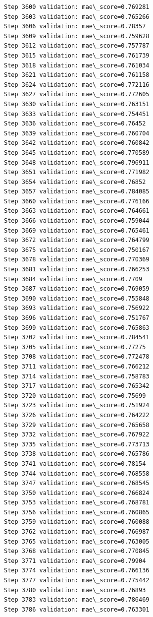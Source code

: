\documentclass[11pt]{article}
\begin{document}
\begin{Verbatim}[commandchars=\\\{\}]
Step 3600 validation: mae\_score=0.769281
Step 3603 validation: mae\_score=0.765266
Step 3606 validation: mae\_score=0.78357
Step 3609 validation: mae\_score=0.759628
Step 3612 validation: mae\_score=0.757787
Step 3615 validation: mae\_score=0.761739
Step 3618 validation: mae\_score=0.761034
Step 3621 validation: mae\_score=0.761158
Step 3624 validation: mae\_score=0.772116
Step 3627 validation: mae\_score=0.772605
Step 3630 validation: mae\_score=0.763151
Step 3633 validation: mae\_score=0.754451
Step 3636 validation: mae\_score=0.76452
Step 3639 validation: mae\_score=0.760704
Step 3642 validation: mae\_score=0.760842
Step 3645 validation: mae\_score=0.770589
Step 3648 validation: mae\_score=0.796911
Step 3651 validation: mae\_score=0.771982
Step 3654 validation: mae\_score=0.76852
Step 3657 validation: mae\_score=0.784085
Step 3660 validation: mae\_score=0.776166
Step 3663 validation: mae\_score=0.764661
Step 3666 validation: mae\_score=0.759044
Step 3669 validation: mae\_score=0.765461
Step 3672 validation: mae\_score=0.764799
Step 3675 validation: mae\_score=0.750167
Step 3678 validation: mae\_score=0.770369
Step 3681 validation: mae\_score=0.766253
Step 3684 validation: mae\_score=0.7709
Step 3687 validation: mae\_score=0.769059
Step 3690 validation: mae\_score=0.755848
Step 3693 validation: mae\_score=0.756922
Step 3696 validation: mae\_score=0.751767
Step 3699 validation: mae\_score=0.765863
Step 3702 validation: mae\_score=0.784541
Step 3705 validation: mae\_score=0.77275
Step 3708 validation: mae\_score=0.772478
Step 3711 validation: mae\_score=0.766212
Step 3714 validation: mae\_score=0.758783
Step 3717 validation: mae\_score=0.765342
Step 3720 validation: mae\_score=0.75699
Step 3723 validation: mae\_score=0.751924
Step 3726 validation: mae\_score=0.764222
Step 3729 validation: mae\_score=0.765658
Step 3732 validation: mae\_score=0.767922
Step 3735 validation: mae\_score=0.773713
Step 3738 validation: mae\_score=0.765786
Step 3741 validation: mae\_score=0.78154
Step 3744 validation: mae\_score=0.768558
Step 3747 validation: mae\_score=0.768545
Step 3750 validation: mae\_score=0.766824
Step 3753 validation: mae\_score=0.768781
Step 3756 validation: mae\_score=0.760865
Step 3759 validation: mae\_score=0.760088
Step 3762 validation: mae\_score=0.766987
Step 3765 validation: mae\_score=0.763005
Step 3768 validation: mae\_score=0.770845
Step 3771 validation: mae\_score=0.79904
Step 3774 validation: mae\_score=0.766136
Step 3777 validation: mae\_score=0.775442
Step 3780 validation: mae\_score=0.76893
Step 3783 validation: mae\_score=0.786469
Step 3786 validation: mae\_score=0.763301

\end{Verbatim}
\end{document}
